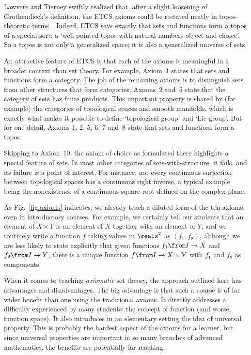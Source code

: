 \documentclass[12pt]{article}
\begin{document}
Lawvere and Tierney swiftly realized that, after a slight loosening of
Grothendieck's definition, the ETCS axioms could be restated neatly in
topos-theoretic terms~\cite{TierSTC,TierAST}.  Indeed, ETCS says exactly
that sets and functions form a topos of a special sort: a `well-pointed
topos with natural numbers object and choice'.  So a topos is not only a
generalized space; it is also a generalized universe of sets.

An attractive feature of ETCS is that each of the axioms is meaningful in a
broader context than set theory.  For example, Axiom~1 states that sets and
functions form a category.  The job of the remaining axioms is to
distinguish sets from other structures that form categories.  Axioms~2
and~5 state that the category of sets has finite products.  This important
property is shared by (for example) the categories of topological spaces
and smooth manifolds, which is exactly what makes it possible to define
`topological group' and `Lie group'.  But for one detail, Axioms 1, 2, 5,
6, 7 and~8 state that sets and functions form a topos.

Skipping to Axiom~10, the axiom of choice as formulated there highlights a
special feature of sets.  In most other categories of sets-with-structure,
it fails, and its failure is a point of interest.  For instance, not every
continuous surjection between topological spaces has a continuous right
inverse, a typical example being the nonexistence of a continuous square
root defined on the complex plane.


As Fig.~\ref{fig:axioms} indicates, we already teach a diluted form of the
ten axioms, even in introductory courses.  For example, we certainly tell
our students that an element of $X \times Y$ is an element of $X$ together
with an element of $Y$, and we routinely write a function $f$ taking values
in $\reals^2$ as $(f_1, f_2)$, although we are less likely to state
explicitly that given functions $f_1\from I \to X$ and $f_2\from I \to Y$,
there is a unique function $f\from I \to X \times Y$ with $f_1$ and $f_2$
as components.

When it comes to teaching \emph{axiomatic} set theory, the approach
outlined here has advantages and disadvantages.  The big advantage is that
such a course is of far wider benefit than one using the traditional
axioms.  It directly addresses a difficulty experienced by many students:
the concept of function (and worse, function space).  It also introduces in
an elementary setting the idea of universal property.  This is probably the
hardest aspect of the axioms for a learner, but since universal properties
are important in so many branches of advanced mathematics, the benefits are
potentially far-reaching.
\end{document}
